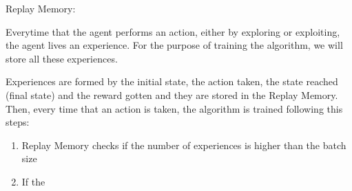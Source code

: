 Replay Memory:

Everytime that the agent performs an action, either by exploring or exploiting, the agent lives an experience. For the purpose of training the algorithm, we will store all these experiences.

Experiences are formed by the initial state, the action taken, the state reached (final state) and the reward gotten and they are stored in the Replay Memory. Then, every time that an action is taken, the algorithm is trained following this steps:

\begin{enumerate}
  \item Replay Memory checks if the number of experiences is higher than the batch size
  \item If the 
\end{enumerate}
